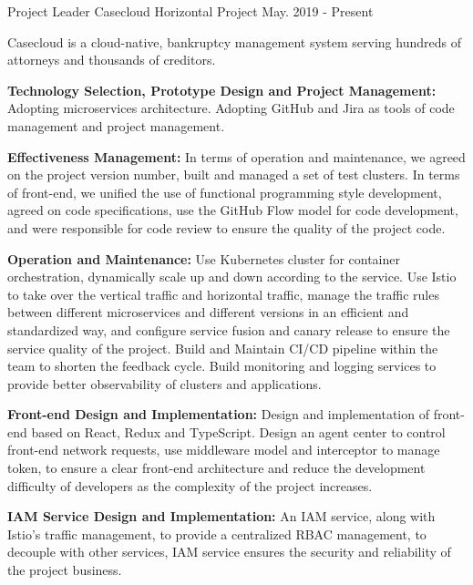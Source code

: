 

\begin{cventries}

  \cventry
    {Project Leader} %
    {Casecloud} %
    {Horizontal Project} %
    {May. 2019 - Present} %
    {
      \begin{cvitems} %
        \item {Casecloud is a cloud-native, bankruptcy management system serving hundreds of attorneys and thousands of creditors.}
        \item {\textbf{Technology Selection, Prototype Design and Project Management:}
        Adopting microservices architecture.
        Adopting GitHub and Jira as tools of code management and project management.}
        \item {\textbf{Effectiveness Management:}
        In terms of operation and maintenance, we agreed on the project version number, built and managed a set of test clusters.
        In terms of front-end, we unified the use of functional programming style development, agreed on code specifications,
        use the GitHub Flow model for code development, and were responsible for code review to ensure the quality of the project code.}
        \item {\textbf{Operation and Maintenance:}
        Use Kubernetes cluster for container orchestration, dynamically scale up and down according to the service.
        Use Istio to take over the vertical traffic and horizontal traffic, manage the traffic rules between different microservices and different versions in an efficient and standardized way, and configure service fusion and canary release to ensure the service quality of the project.
        Build and Maintain CI/CD pipeline within the team to shorten the feedback cycle.
        Build monitoring and logging services to provide better observability of clusters and applications.}
        \item {\textbf{Front-end Design and Implementation:}
        Design and implementation of front-end based on React, Redux and TypeScript.
        Design an agent center to control front-end network requests, use middleware model and interceptor to manage token,
        to ensure a clear front-end architecture and reduce the development difficulty of developers as the complexity of the project increases.}
        \item {\textbf{IAM Service Design and Implementation:}
        An IAM service, along with Istio's traffic management, to provide a centralized RBAC management,
        to decouple with other services, IAM service ensures the security and reliability of the project business.}
      \end{cvitems}
    }


\end{cventries}

